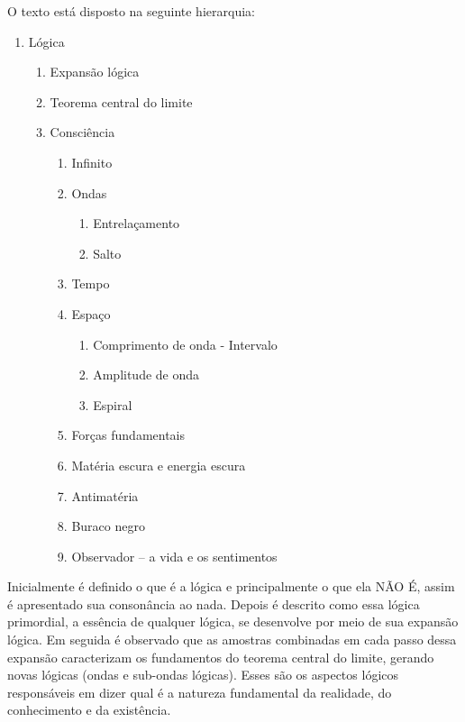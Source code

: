 \noindent O texto está disposto na seguinte hierarquia:
	\begin{enumerate}[label*=\arabic*.]
	   \item Lógica
	   \begin{enumerate}[label*=\arabic*.]
		   \item Expansão lógica
		   \item Teorema central do limite
		   \item Consciência
			   \begin{enumerate}[label*=\arabic*.]
				   \item Infinito
				   \item Ondas 
				   \begin{enumerate}[label*=\arabic*.]
				   		\item Entrelaçamento
				   		\item Salto
				   \end{enumerate}  
				   \item Tempo
				   \item Espaço
				   \begin{enumerate}[label*=\arabic*.]
				   		\item Comprimento de onda - Intervalo
					    \item Amplitude de onda
				   		\item Espiral
				   \end{enumerate} 
				   \item Forças fundamentais
				   \item Matéria escura e energia escura
				   \item Antimatéria
				   \item Buraco negro
				   \item Observador – a vida e os sentimentos
			   \end{enumerate}   
	   \end{enumerate}
	\end{enumerate}

Inicialmente é definido o que é a lógica e principalmente o que ela NÃO É, assim é apresentado sua consonância ao nada. Depois é descrito como essa lógica primordial, a essência de qualquer lógica, se desenvolve por meio de sua expansão lógica. Em seguida é observado que as amostras combinadas em cada passo dessa expansão caracterizam os fundamentos do teorema central do limite, gerando novas lógicas (ondas e sub-ondas lógicas). Esses são os aspectos lógicos responsáveis em dizer qual é a natureza fundamental da realidade, do conhecimento e da existência. 

\bigbreak